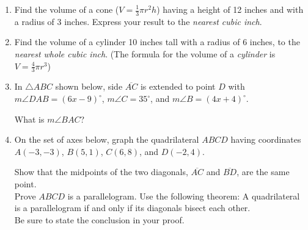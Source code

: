 \documentclass[12pt, twoside]{article}
\begin{document}
\begin{enumerate}
  \newpage

  \item Find the volume of a cone ($V=\frac{1}{3}\pi r^2 h$) having a height of 12 inches and with a radius of 3 inches. Express your result to the \emph{nearest cubic inch}. \vspace{5cm}

  \item Find the volume of a cylinder 10 inches tall with a radius of 6 inches, to the \emph{nearest whole cubic inch}. (The formula for the volume of a \emph{cylinder} is $V=\frac{4}{3}\pi r^3$)  \vspace{5cm}


 \item In  $\triangle ABC$ shown below, side $\overline{AC}$ is extended to point $D$ with $m\angle DAB=(6x-9)^\circ$, $m\angle C=35^\circ$, and $m\angle B=(4x+4)^\circ$.
   \begin{center}
   \end{center}
   What is $m\angle BAC$?

 \newpage
   \item On the set of axes below, graph the quadrilateral $ABCD$ having coordinates $A(-3,-3)$, $B(5,1)$, $C(6,8)$, and $D(-2,4)$.
     \begin{center} %
     \end{center}
     Show that the midpoints of the two diagonals, $\overline{AC}$ and $\overline{BD}$, are the same point. \\[5cm]
     Prove $ABCD$ is a parallelogram. Use the following theorem:
     A quadrilateral is a parallelogram if and only if its diagonals bisect each other. \\[0.5cm]
     Be sure to state the conclusion in your proof.

  \end{enumerate}
  \newpage
  \setcounter{page}{1}
\end{document}
